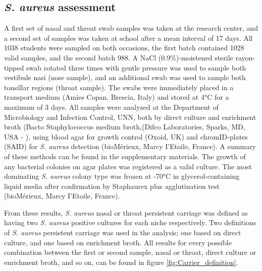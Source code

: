 \clearpage

\subsection{ \textit{S. aureus} assessment}

A first set of nasal and throat swab samples was taken at the research center, and a second set of samples was taken at school after a mean interval of 17 days. All 1038 students were sampled on both occasions, the first batch contained 1028 valid samples, and the second batch 988. A NaCl (0.9\%)-moistened sterile rayon-tipped swab rotated three times with gentle pressure was used to sample both vestibule nasi (nose sample), and an additional swab was used to sample both tonsillar regions (throat sample). The swabs were immediately placed in a transport medium (Amies Copan, Brescia, Italy) and stored at 4°C for a maximum of 3 days. All samples were analyzed at the Department of Microbiology and Infection Control, UNN, both by direct culture \cite{Olsen2011} and enrichment broth (Bacto Staphylococcus medium broth,(Difco Laboratories, Sparks, MD, USA - \cite{Stensen2019}), using blood agar for growth control (Oxoid, UK) and chromID-plates (SAID) for \textit{S. aureus} detection (bioMérieux, Marcy I’Etoile, France). A summary of these methods can be found in the supplementary materials. The growth of any bacterial colonies on agar plates was registered as a valid culture. The most dominating \textit{S. aureus} colony type was frozen at -70°C in glycerol-containing liquid media after confirmation by Staphaurex plus agglutination test (bioMérieux, Marcy I’Etoile, France).



From these results, \textit{S. aureus} nasal or throat persistent carriage was defined as having two \textit{S. aureus} positive cultures for each niche respectively. \cite{Nouwen2004, vanBelkum2009} Two definitions of \textit{S. aureus} persistent carriage was used in the analysis; one based on direct culture, and one based on enrichment broth. All results for every possible combination between the first or second sample, nasal or throat, direct culture or enrichment broth, and so on, can be found in figure \ref{fig:Carrier_definition}. 


